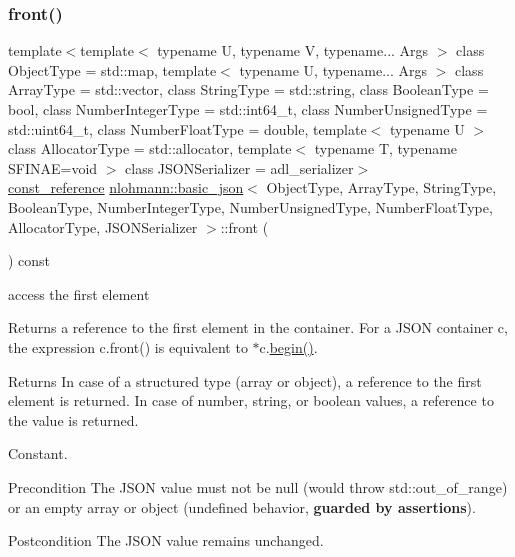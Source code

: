 \subsubsection{\texorpdfstring{front()}{front()}\hspace{0.1cm}{\footnotesize\ttfamily [2/2]}}
{\footnotesize\ttfamily template$<$template$<$ typename U, typename V, typename... Args $>$ class Object\+Type = std\+::map, template$<$ typename U, typename... Args $>$ class Array\+Type = std\+::vector, class String\+Type  = std\+::string, class Boolean\+Type  = bool, class Number\+Integer\+Type  = std\+::int64\+\_\+t, class Number\+Unsigned\+Type  = std\+::uint64\+\_\+t, class Number\+Float\+Type  = double, template$<$ typename U $>$ class Allocator\+Type = std\+::allocator, template$<$ typename T, typename S\+F\+I\+N\+A\+E=void $>$ class J\+S\+O\+N\+Serializer = adl\+\_\+serializer$>$ \\
\mbox{\hyperlink{classnlohmann_1_1basic__json_a4057c5425f4faacfe39a8046871786ca}{const\+\_\+reference}} \mbox{\hyperlink{classnlohmann_1_1basic__json}{nlohmann\+::basic\+\_\+json}}$<$ Object\+Type, Array\+Type, String\+Type, Boolean\+Type, Number\+Integer\+Type, Number\+Unsigned\+Type, Number\+Float\+Type, Allocator\+Type, J\+S\+O\+N\+Serializer $>$\+::front (\begin{DoxyParamCaption}{ }\end{DoxyParamCaption}) const\hspace{0.3cm}{\ttfamily [inline]}}



access the first element 

Returns a reference to the first element in the container. For a J\+S\+ON container {\ttfamily c}, the expression {\ttfamily c.\+front()} is equivalent to {\ttfamily $\ast$c.\mbox{\hyperlink{classnlohmann_1_1basic__json_a0ff28dac23f2bdecee9564d07f51dcdc}{begin()}}}.

\begin{DoxyReturn}{Returns}
In case of a structured type (array or object), a reference to the first element is returned. In case of number, string, or boolean values, a reference to the value is returned.
\end{DoxyReturn}
Constant.

\begin{DoxyPrecond}{Precondition}
The J\+S\+ON value must not be {\ttfamily null} (would throw {\ttfamily std\+::out\+\_\+of\+\_\+range}) or an empty array or object (undefined behavior, {\bfseries guarded by assertions}). 
\end{DoxyPrecond}
\begin{DoxyPostcond}{Postcondition}
The J\+S\+ON value remains unchanged.
\end{DoxyPostcond}

